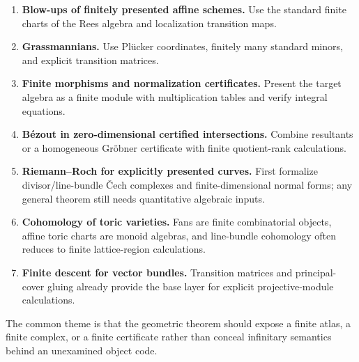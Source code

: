 \begin{enumerate}[label=\arabic*.]
\item \textbf{Blow-ups of finitely presented affine schemes.}  Use the standard finite charts of the
      Rees algebra and localization transition maps.
\item \textbf{Grassmannians.}  Use Pl\"ucker coordinates, finitely many standard minors, and explicit
      transition matrices.
\item \textbf{Finite morphisms and normalization certificates.}  Present the target algebra as a
      finite module with multiplication tables and verify integral equations.
\item \textbf{B\'ezout in zero-dimensional certified intersections.}  Combine resultants or a
      homogeneous Gröbner certificate with finite quotient-rank calculations.
\item \textbf{Riemann--Roch for explicitly presented curves.}  First formalize divisor/line-bundle
      \v{C}ech complexes and finite-dimensional normal forms; any general theorem still needs
      quantitative algebraic inputs.
\item \textbf{Cohomology of toric varieties.}  Fans are finite combinatorial objects, affine toric
      charts are monoid algebras, and line-bundle cohomology often reduces to finite lattice-region
      calculations.
\item \textbf{Finite descent for vector bundles.}  Transition matrices and principal-cover gluing
      already provide the base layer for explicit projective-module calculations.
\end{enumerate}

The common theme is that the geometric theorem should expose a finite atlas, a finite complex, or a
finite certificate rather than conceal infinitary semantics behind an unexamined object code.
